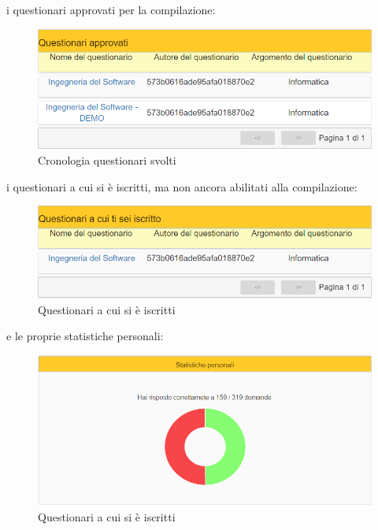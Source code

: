 i questionari approvati per la compilazione:
\begin{figure}[ht]
	\centering
	\includegraphics[scale=0.45]{img/questionari_approvati.png}
	\caption{Cronologia questionari svolti}
\end{figure}
\FloatBarrier

\newpage
i questionari a cui si è iscritti, ma non ancora abilitati alla compilazione: 

\label{QuestionariIscritto}
\begin{figure}[ht]
	\centering
	\includegraphics[scale=0.45]{img/questionari_iscritto.png}
	\caption{Questionari a cui si è iscritti}
\end{figure}
\FloatBarrier

e le proprie statistiche personali:

\label{StatistichePersonali}
\begin{figure}[ht]
	\centering
	\includegraphics[scale=0.45]{img/statistiche_personali.png}
	\caption{Questionari a cui si è iscritti}
\end{figure}
\FloatBarrier